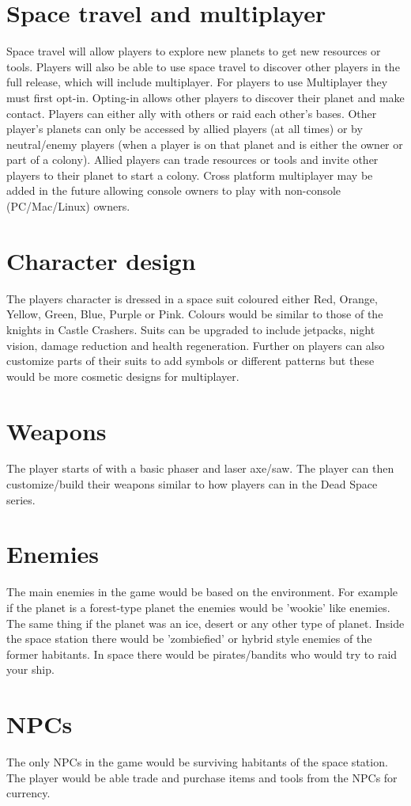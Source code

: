 \documentclass[12pt]{article}
\begin{document}
\section{Space travel and multiplayer}
Space travel will allow players to explore new planets to get new resources or tools. Players will also be able to use space travel to discover other players in the full release, which will include multiplayer. For players to use Multiplayer they must first opt-in. Opting-in allows other players to discover their planet and make contact. Players can either ally with others or raid each other's bases. Other player's planets can only be accessed by allied players (at all times) or by neutral/enemy players (when a player is on that planet and is either the owner or part of a colony). Allied players can trade resources or tools and invite other players to their planet to start a colony. Cross platform multiplayer may be added in the future allowing console owners to play with non-console (PC/Mac/Linux) owners. 
\section{Character design}
The players character is dressed in a space suit coloured either Red, Orange, Yellow, Green, Blue, Purple or Pink. Colours would be similar to those of the knights in Castle Crashers. Suits can be upgraded to include jetpacks, night vision, damage reduction and health regeneration. Further on players can also customize parts of their suits to add symbols or different patterns but these would be more cosmetic designs for multiplayer.
\section{Weapons}
The player starts of with a basic phaser and laser axe/saw. The player can then customize/build their weapons similar to how players can in the Dead Space series.
\section{Enemies}
The main enemies in the game would be based on the environment. For example if the planet is a forest-type planet the enemies would be 'wookie' like enemies. The same thing if the planet was an ice, desert or any other type of planet. Inside the space station there would be 'zombiefied' or hybrid style enemies of the former habitants. In space there would be pirates/bandits who would try to raid your ship.
\section{NPCs}
The only NPCs in the game would be surviving habitants of the space station. The player would be able trade and purchase items and tools from the NPCs for currency.
\end{document}
